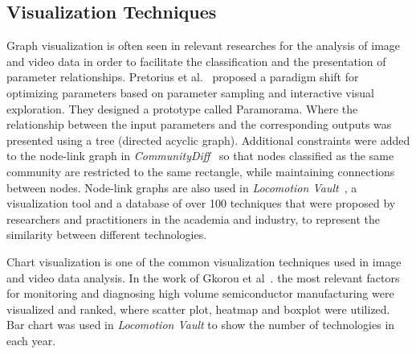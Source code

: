 \documentclass[a4paper,fleqn]{cas-dc}
\begin{document}
\subsection{Visualization Techniques}
Graph visualization is often seen in relevant researches for the analysis of image and video data in order to facilitate the classification and the presentation of parameter relationships.
Pretorius et al.~\cite{Pretorius2011} proposed a paradigm shift for optimizing parameters based on parameter sampling and interactive visual exploration. They designed a prototype called Paramorama. Where the relationship between the input parameters and the corresponding outputs was presented using a tree (directed acyclic graph).
Additional constraints were added to the node-link graph in \textit{CommunityDiff}~\cite{Emelyanova} so that nodes classified as the same community are restricted to the same rectangle, while maintaining connections between nodes.
Node-link graphs are also used in \textit{Locomotion Vault}~\cite{Luca2021}, a visualization tool and a database of over 100 techniques that were proposed by researchers and practitioners in the academia and industry, to represent the similarity between different technologies.

Chart visualization is one of the common visualization techniques used in image and video data analysis. In the work of Gkorou et al~\cite{Gkorou2017}. the most relevant factors for monitoring and diagnosing high volume semiconductor manufacturing were visualized and ranked, where scatter plot, heatmap and boxplot were utilized.
Bar chart was used in \textit{Locomotion Vault} to show the number of technologies in each year.
\end{document}
